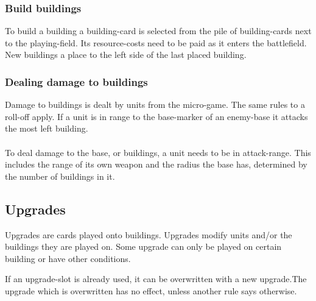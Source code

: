 \documentclass[a5paper,pagesize,10pt,bibtotoc,pointlessnumbers,
normalheadings,DIV=9,twoside=false]{scrbook}
\begin{document}
\subsubsection{Build buildings}
To build a building a building-card is selected from the pile of building-cards next to the playing-field. Its resource-costs need to be paid as it enters the battlefield.
New buildings a place to the left side of the last placed building.

\subsubsection{Dealing damage to buildings}
Damage to buildings is dealt by units from the micro-game. The same rules to a roll-off apply. If a unit is in range to the base-marker of an enemy-base it attacks the most left building.\\
\\
To deal damage to the base, or buildings, a unit needs to be in attack-range. This includes the range of its own weapon and the radius the base has, determined by the number of buildings in it.

\subsection{Upgrades}
Upgrades are cards played onto buildings. Upgrades modify units and/or the buildings they are played on. Some upgrade can only be played on certain building or have other conditions.

If an upgrade-slot is already used, it can be overwritten with a new upgrade.The upgrade which is overwritten has no effect, unless another rule says otherwise.\\
\end{document}
